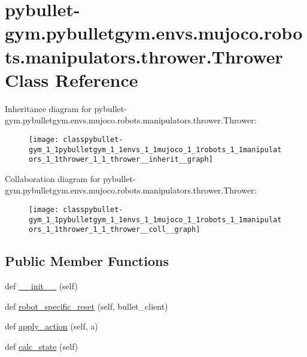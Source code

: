\hypertarget{classpybullet-gym_1_1pybulletgym_1_1envs_1_1mujoco_1_1robots_1_1manipulators_1_1thrower_1_1_thrower}{}\section{pybullet-\/gym.pybulletgym.\+envs.\+mujoco.\+robots.\+manipulators.\+thrower.\+Thrower Class Reference}
\label{classpybullet-gym_1_1pybulletgym_1_1envs_1_1mujoco_1_1robots_1_1manipulators_1_1thrower_1_1_thrower}


Inheritance diagram for pybullet-\/gym.pybulletgym.\+envs.\+mujoco.\+robots.\+manipulators.\+thrower.\+Thrower\+:
\nopagebreak
\begin{figure}[H]
\begin{center}
\leavevmode
\texttt{[image: classpybullet-gym\_1\_1pybulletgym\_1\_1envs\_1\_1mujoco\_1\_1robots\_1\_1manipulators\_1\_1thrower\_1\_1\_thrower\_\_inherit\_\_graph]}
\end{center}
\end{figure}


Collaboration diagram for pybullet-\/gym.pybulletgym.\+envs.\+mujoco.\+robots.\+manipulators.\+thrower.\+Thrower\+:
\nopagebreak
\begin{figure}[H]
\begin{center}
\leavevmode
\texttt{[image: classpybullet-gym\_1\_1pybulletgym\_1\_1envs\_1\_1mujoco\_1\_1robots\_1\_1manipulators\_1\_1thrower\_1\_1\_thrower\_\_coll\_\_graph]}
\end{center}
\end{figure}
\subsection*{Public Member Functions}
\begin{DoxyCompactItemize}
\item 
def \hyperlink{classpybullet-gym_1_1pybulletgym_1_1envs_1_1mujoco_1_1robots_1_1manipulators_1_1thrower_1_1_thrower_a7db12533127bf1e7a20953ce729a5f90}{\+\_\+\+\_\+init\+\_\+\+\_\+} (self)
\item 
def \hyperlink{classpybullet-gym_1_1pybulletgym_1_1envs_1_1mujoco_1_1robots_1_1manipulators_1_1thrower_1_1_thrower_aaba802c142334bdbd981cbef8b381ac6}{robot\+\_\+specific\+\_\+reset} (self, bullet\+\_\+client)
\item 
def \hyperlink{classpybullet-gym_1_1pybulletgym_1_1envs_1_1mujoco_1_1robots_1_1manipulators_1_1thrower_1_1_thrower_a1094e56cc3cf3cd48100bd601fdd9674}{apply\+\_\+action} (self, a)
\item 
def \hyperlink{classpybullet-gym_1_1pybulletgym_1_1envs_1_1mujoco_1_1robots_1_1manipulators_1_1thrower_1_1_thrower_acf09e3ffd16fa86b4ab3157f813cb3e8}{calc\+\_\+state} (self)
\end{DoxyCompactItemize}
